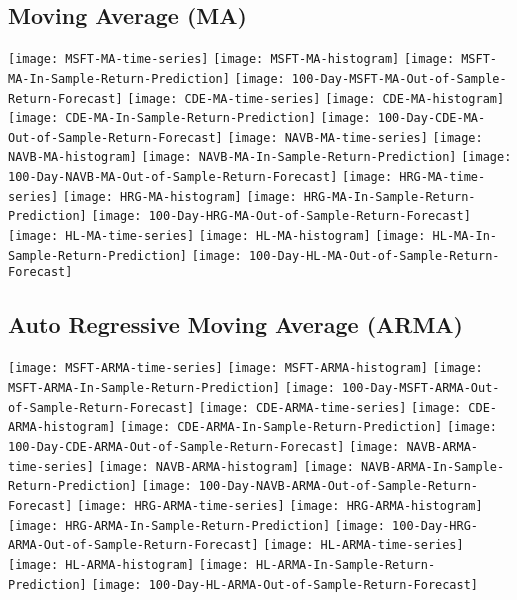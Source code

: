 \subsection{Moving Average (MA)}
\texttt{[image: MSFT-MA-time-series]}
\texttt{[image: MSFT-MA-histogram]}
\texttt{[image: MSFT-MA-In-Sample-Return-Prediction]}
\texttt{[image: 100-Day-MSFT-MA-Out-of-Sample-Return-Forecast]}
\texttt{[image: CDE-MA-time-series]}
\texttt{[image: CDE-MA-histogram]}
\texttt{[image: CDE-MA-In-Sample-Return-Prediction]}
\texttt{[image: 100-Day-CDE-MA-Out-of-Sample-Return-Forecast]}
\texttt{[image: NAVB-MA-time-series]}
\texttt{[image: NAVB-MA-histogram]}
\texttt{[image: NAVB-MA-In-Sample-Return-Prediction]}
\texttt{[image: 100-Day-NAVB-MA-Out-of-Sample-Return-Forecast]}
\texttt{[image: HRG-MA-time-series]}
\texttt{[image: HRG-MA-histogram]}
\texttt{[image: HRG-MA-In-Sample-Return-Prediction]}
\texttt{[image: 100-Day-HRG-MA-Out-of-Sample-Return-Forecast]}
\texttt{[image: HL-MA-time-series]}
\texttt{[image: HL-MA-histogram]}
\texttt{[image: HL-MA-In-Sample-Return-Prediction]}
\texttt{[image: 100-Day-HL-MA-Out-of-Sample-Return-Forecast]}

\subsection{Auto Regressive Moving Average (ARMA)}
\texttt{[image: MSFT-ARMA-time-series]}
\texttt{[image: MSFT-ARMA-histogram]}
\texttt{[image: MSFT-ARMA-In-Sample-Return-Prediction]}
\texttt{[image: 100-Day-MSFT-ARMA-Out-of-Sample-Return-Forecast]}
\texttt{[image: CDE-ARMA-time-series]}
\texttt{[image: CDE-ARMA-histogram]}
\texttt{[image: CDE-ARMA-In-Sample-Return-Prediction]}
\texttt{[image: 100-Day-CDE-ARMA-Out-of-Sample-Return-Forecast]}
\texttt{[image: NAVB-ARMA-time-series]}
\texttt{[image: NAVB-ARMA-histogram]}
\texttt{[image: NAVB-ARMA-In-Sample-Return-Prediction]}
\texttt{[image: 100-Day-NAVB-ARMA-Out-of-Sample-Return-Forecast]}
\texttt{[image: HRG-ARMA-time-series]}
\texttt{[image: HRG-ARMA-histogram]}
\texttt{[image: HRG-ARMA-In-Sample-Return-Prediction]}
\texttt{[image: 100-Day-HRG-ARMA-Out-of-Sample-Return-Forecast]}
\texttt{[image: HL-ARMA-time-series]}
\texttt{[image: HL-ARMA-histogram]}
\texttt{[image: HL-ARMA-In-Sample-Return-Prediction]}
\texttt{[image: 100-Day-HL-ARMA-Out-of-Sample-Return-Forecast]}

